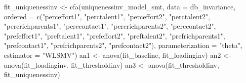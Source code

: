 \documentclass[
  12pt,
]{article}
\newenvironment{Shaded}{\begin{snugshade}}{\end{snugshade}}
\newcommand{\AttributeTok}[1]{\textcolor[rgb]{0.40,0.45,0.13}{#1}}
\newcommand{\FunctionTok}[1]{\textcolor[rgb]{0.28,0.35,0.67}{#1}}
\newcommand{\NormalTok}[1]{\textcolor[rgb]{0.00,0.23,0.31}{#1}}
\newcommand{\OtherTok}[1]{\textcolor[rgb]{0.00,0.23,0.31}{#1}}
\newcommand{\StringTok}[1]{\textcolor[rgb]{0.13,0.47,0.30}{#1}}
\begin{document}
\begin{Shaded}
\begin{Highlighting}[]
\NormalTok{fit\_uniquenessinv }\OtherTok{\textless{}{-}} \FunctionTok{cfa}\NormalTok{(uniquenessinv\_model\_smt, }\AttributeTok{data =}\NormalTok{ db\_invariance,}
                         \AttributeTok{ordered =} \FunctionTok{c}\NormalTok{(}\StringTok{"perceffort1"}\NormalTok{, }\StringTok{"perctalent1"}\NormalTok{, }\StringTok{"perceffort2"}\NormalTok{, }\StringTok{"perctalent2"}\NormalTok{,}
                                     \StringTok{"percrichparents1"}\NormalTok{, }\StringTok{"perccontact1"}\NormalTok{, }\StringTok{"percrichparents2"}\NormalTok{, }\StringTok{"perccontact2"}\NormalTok{,}
                                     \StringTok{"prefeffort1"}\NormalTok{, }\StringTok{"preftalent1"}\NormalTok{, }\StringTok{"prefeffort2"}\NormalTok{, }\StringTok{"preftalent2"}\NormalTok{,}
                                     \StringTok{"prefrichparents1"}\NormalTok{, }\StringTok{"prefcontact1"}\NormalTok{, }\StringTok{"prefrichparents2"}\NormalTok{, }\StringTok{"prefcontact2"}\NormalTok{),}
                         \AttributeTok{parameterization =} \StringTok{"theta"}\NormalTok{,}
                         \AttributeTok{estimator =} \StringTok{"WLSMV"}\NormalTok{)}
\NormalTok{an1 }\OtherTok{\textless{}{-}} \FunctionTok{anova}\NormalTok{(fit\_baseline, fit\_loadinginv)}
\NormalTok{an2 }\OtherTok{\textless{}{-}} \FunctionTok{anova}\NormalTok{(fit\_loadinginv, fit\_thresholdinv)}
\NormalTok{an3 }\OtherTok{\textless{}{-}} \FunctionTok{anova}\NormalTok{(fit\_thresholdinv, fit\_uniquenessinv)}


\end{Highlighting}
\end{Shaded}
\end{document}
